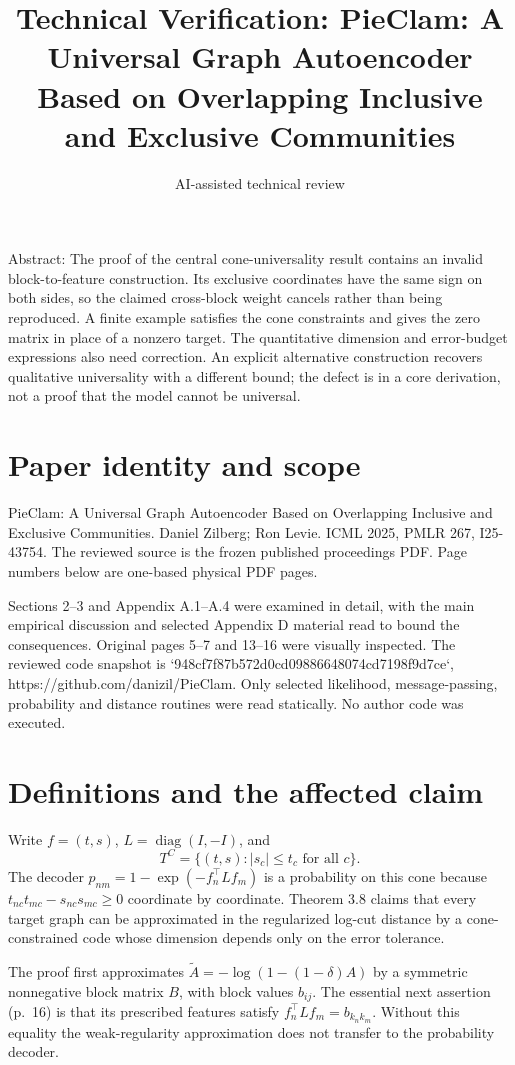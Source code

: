 \documentclass[10pt]{article}
\title{Technical Verification: PieClam: A Universal Graph Autoencoder Based on Overlapping Inclusive and Exclusive Communities}
\author{AI-assisted technical review}
\date{}
\begin{document}
\maketitle
Abstract: The proof of the central cone-universality result contains an invalid block-to-feature construction. Its exclusive coordinates have the same sign on both sides, so the claimed cross-block weight cancels rather than being reproduced. A finite example satisfies the cone constraints and gives the zero matrix in place of a nonzero target. The quantitative dimension and error-budget expressions also need correction. An explicit alternative construction recovers qualitative universality with a different bound; the defect is in a core derivation, not a proof that the model cannot be universal.\par
\section*{Paper identity and scope}
PieClam: A Universal Graph Autoencoder Based on Overlapping Inclusive and Exclusive Communities. Daniel Zilberg; Ron Levie. ICML 2025, PMLR 267, I25-43754. The reviewed source is the frozen published proceedings PDF. Page numbers below are one-based physical PDF pages.\par
Sections 2–3 and Appendix A.1–A.4 were examined in detail, with the main empirical discussion and selected Appendix D material read to bound the consequences. Original pages 5–7 and 13–16 were visually inspected. The reviewed code snapshot is `948cf7f87b572d0cd09886648074cd7198f9d7ce`, https://github.com/danizil/PieClam. Only selected likelihood, message-passing, probability and distance routines were read statically. No author code was executed.\par
\section*{Definitions and the affected claim}
Write \(f=(t,s)\), \(L=\operatorname{diag}(I,-I)\), and \[T^C=\{(t,s): |s_c|\le t_c\text{ for all }c\}.\] The decoder \(p_{nm}=1-\exp(-f_n^\top Lf_m)\) is a probability on this cone because \(t_{nc}t_{mc}-s_{nc}s_{mc}\ge0\) coordinate by coordinate. Theorem 3.8 claims that every target graph can be approximated in the regularized log-cut distance by a cone-constrained code whose dimension depends only on the error tolerance.\par
The proof first approximates \(\widetilde A=-\log(1-(1-\delta)A)\) by a symmetric nonnegative block matrix \(B\), with block values \(b_{ij}\). The essential next assertion (p. 16) is that its prescribed features satisfy \(f_n^\top Lf_m=b_{k_nk_m}\). Without this equality the weak-regularity approximation does not transfer to the probability decoder.\par
\end{document}
